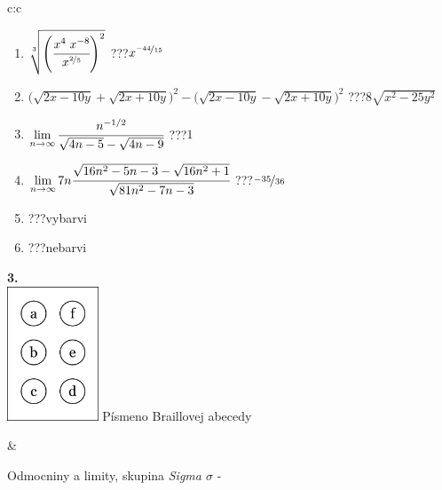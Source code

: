 \documentclass[10pt]{report}
\begin{document}
\begin{tabular}{c:c}
\begin{minipage}[c][104.5mm][t]{0.5\linewidth}
\begin{center}
\begin{minipage}{0.79\linewidth}
\begin{center}
\begin{varwidth}{\linewidth}
\begin{enumerate}
\small
\item $\sqrt[3]{\left(\cfrac{x^{4}\;x^{-8}}{x^{\nicefrac{2}{5}}}\right)^{2}}$\quad \dotfill\; ???\;\dotfill \quad $x^{\nicefrac{-44}{15}}$
\item {\footnotesize{\scriptsize$\big(\sqrt{2x-10y}+\sqrt{2x+10y}\big)^2-\big(\sqrt{2x-10y}-\sqrt{2x+10y}\big)^2$}\quad \dotfill\; ???\;\dotfill \quad $8\sqrt{x^2-25y^2}$}
\item $\lim\limits_{n\to\infty}\cfrac{n^{-1/2}}{\sqrt{4n-5}-\sqrt{4n-9}}$\quad \dotfill\; ???\;\dotfill \quad $1$
\item $\lim\limits_{n\to\infty}7n\cfrac{\sqrt{16n^2-5n-3}-\sqrt{16n^2+1}}{\sqrt{81n^2-7n-3}}$\quad \dotfill\; ???\;\dotfill \quad $\nicefrac{-35}{36}$
\item \quad \dotfill\; ???\;\dotfill \quad vybarvi
\item \quad \dotfill\; ???\;\dotfill \quad nebarvi
\end{enumerate}
\end{varwidth}
\end{center}
\end{minipage}
\begin{minipage}{0.20\linewidth}
\begin{center}
{\Huge\bfseries 3.} \\[2mm]
\includegraphics[height=40mm]{../images/braille.png}
{\small Písmeno Braillovej abecedy}
\end{center}
\end{minipage}
\end{center}
\end{minipage}
&
\begin{minipage}[c][104.5mm][t]{0.5\linewidth}
\begin{center}
\vspace{7mm}
{\huge Odmocniny a limity, skupina \textit{Sigma $\sigma$} -}\\[5mm]

\end{center}
\end{minipage}
\end{tabular}
\end{document}
